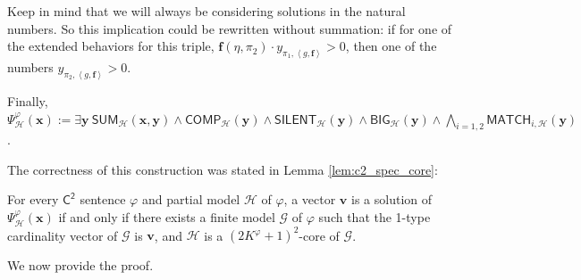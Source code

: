 \documentclass[10pt,a4paper]{article}
\theoremstyle{definition}
\theoremstyle{remark}
\newcommand{\cG}{\mathcal{G}}
\newcommand{\cH}{\mathcal{H}}
\newcommand{\bff}{\mathbf{f}}
\newcommand{\bfv}{\mathbf{v}}
\newcommand{\bfx}{\mathbf{x}}
\newcommand{\bfy}{\mathbf{y}}
\newcommand{\Ctwo}    {\mathsf{C^2}}
\newcommand{\tuple}[1]       {\left\langle #1 \right\rangle}
\newcommand{\summ}  {\mathsf{SUM}}
\newcommand{\comp}  {\mathsf{COMP}}
\newcommand{\silent}  {\mathsf{SILENT}}
\newcommand{\bige}  {\mathsf{BIG}}
\newcommand{\match} {\mathsf{MATCH}}
\begin{document}
\begin{compactitem}
        Keep in mind that we will always be considering solutions in the natural numbers. So this implication could be rewritten without summation: if for one of the extended behaviors for this triple, $\bff(\eta, \pi_2) \cdot y_{\pi_1, \tuple{g, \bff}} > 0$, then  one of the numbers $y_{\pi_2, \tuple{g, \bff}} > 0$.
\end{compactitem}
    Finally, $\displaystyle
        \Psi^\varphi_{\cH}(\bfx)
             :=
             \exists \bfy\ 
            \summ_{\cH}(\bfx, \bfy) \land
            \comp_{\cH}(\bfy) \land
            \silent_{\cH}(\bfy) \land
            \bige_{\cH}(\bfy) \land
            \bigwedge_{i=1, 2}
            \match_{i, \cH}(\bfy)$.
            
The correctness of this construction was stated in Lemma \ref{lem:c2_spec_core}:

\medskip

    For every $\Ctwo$ sentence $\varphi$ and partial model $\cH$ of $\varphi$,
    a vector $\bfv$ is a solution of $\Psi^\varphi_\cH(\bfx)$
    if and only if
    there exists a finite model $\cG$ of $\varphi$ such that
    the 1-type cardinality vector of $\cG$ is $\bfv$,
    and $\cH$ is a $(2K^\varphi+1)^2$-core of $\cG$.

\medskip

We now provide the proof.
\end{document}

